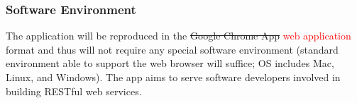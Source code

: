 \documentclass{article}
\begin{document}
\subsubsection{ Software​ ​Environment  }
The application will be reproduced in the \sout{Google Chrome App} \textcolor{red}{web application} format and thus will not require any special software environment (standard environment able to support the web browser will suffice; OS includes Mac, Linux, and Windows). The app aims to serve software developers involved​ ​in​ ​building​ ​RESTful​ ​web​ ​services. 









\end{document}
